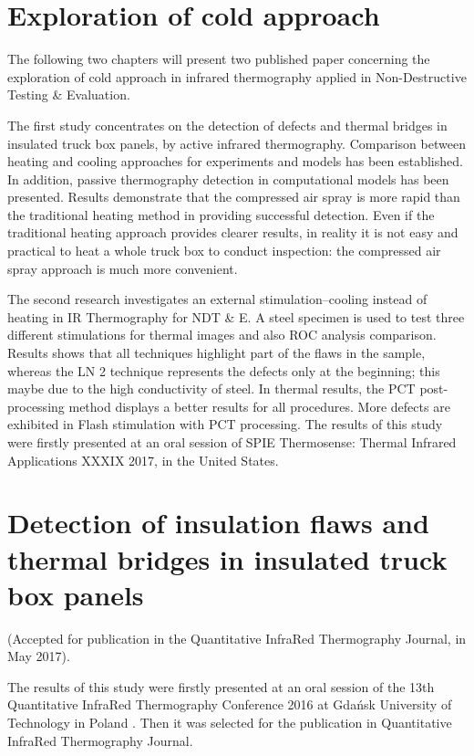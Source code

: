 \chapter*{Exploration of cold approach}     %
The following two chapters will present two published paper concerning the exploration of cold approach in infrared thermography applied in Non-Destructive Testing \& Evaluation.

The first study concentrates on the detection of defects and thermal bridges in insulated truck box panels, by active infrared thermography. Comparison between heating and cooling approaches for experiments and models has been established. In addition, passive thermography detection in computational models has been presented. Results demonstrate that the compressed air spray is more rapid than the traditional heating method in providing successful detection. Even if the traditional heating approach provides clearer results, in reality it is not easy and practical to heat a whole truck box to conduct inspection: the compressed air spray approach is much more convenient.

The second research investigates an external stimulation–cooling instead of heating in IR Thermography for NDT \& E. A steel specimen is used to test three different stimulations for thermal images and also ROC analysis comparison. Results shows that all techniques highlight part of the flaws in the sample, whereas the LN 2 technique represents the defects only at the beginning; this maybe due to the high conductivity of steel. In thermal results, the PCT post-processing method displays a better results for all procedures. More defects are exhibited in Flash stimulation with PCT processing.  The results of this study were firstly presented at an oral session of SPIE Thermosense: Thermal Infrared Applications XXXIX 2017, in the United States.

\chapter{Detection of insulation flaws and thermal bridges in insulated truck box panels}
(Accepted for publication in the Quantitative InfraRed Thermography Journal, in May 2017).

%

The results of this study were firstly presented at an oral session of the 13th Quantitative InfraRed Thermography Conference 2016 at Gdańsk University of Technology in Poland . Then it was selected for the publication in Quantitative InfraRed Thermography Journal.


